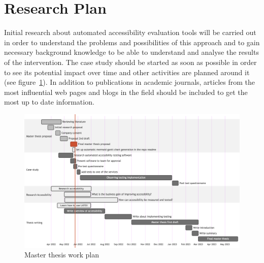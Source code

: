 \documentclass{thesis_proposal}
\begin{document}
\section{Research Plan}
Initial research about automated accessibility evaluation tools will be carried out in order to understand the problems and possibilities of this approach and to gain necessary background knowledge to be able to understand and analyse the results of the intervention.
The case study should be started as soon as possible in order to see its potential impact over time and other activities are planned around it (see figure~\ref{fig:plan}).
In addition to publications in academic journals, articles from the most influential web pages and blogs in the field should be included to get the most up to date information.
\begin{figure}[ht!]
	\includegraphics[width=1\textwidth]{img/timeline.png}
	\caption{Master thesis work plan}\label{fig:plan}
\end{figure}

\pagebreak
\printbibliography{}
\nocite{*}
\end{document}
